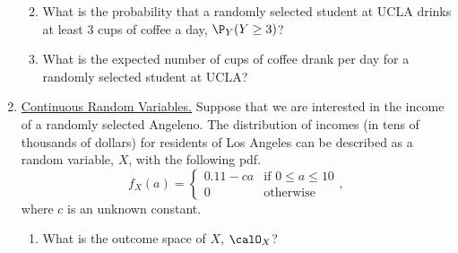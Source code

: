 \documentclass[10pt]{article}
\begin{document}
\begin{enumerate}
\begin{enumerate}
			 
		\item What is the probability that a randomly selected student at UCLA drinks at least 3 cups of coffee a day, \(\P_Y(Y\geq 3)\)?

			 
		\item What is the expected number of cups of coffee drank per day for a randomly selected student at UCLA?

			 
	\end{enumerate}
	\item \underline{Continuous Random Variables.} Suppose that we are interested in the income of a randomly selected Angeleno. The distribution of incomes (in tens of thousands of dollars) for residents of Los Angeles can be described as a random variable, \(X\), with the following pdf.
	\[
		f_X(a) = \begin{cases}
			0.11 - ca & \text{if } 0 \leq a \leq 10 \\
			0 &\text{otherwise }
		\end{cases}
	,\] 
	where \(c\) is an unknown constant.
	\begin{enumerate}
		\item What is the outcome space of \(X\), \(\calO_X\)? 


\end{enumerate}
\end{enumerate}
\end{document}
